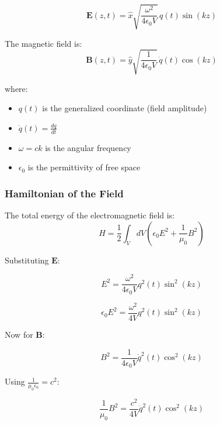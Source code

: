 \begin{equation}
\mathbf{E}(z,t) = \hat{x} \sqrt{\frac{\omega^2}{4 \epsilon_0 V}} \, q(t) \sin(kz)
\end{equation}

The magnetic field is:
\begin{equation}
\mathbf{B}(z,t) = \hat{y} \sqrt{\frac{1}{4 \epsilon_0 V}} \, \dot{q}(t) \cos(kz)
\end{equation}

where:
\begin{itemize}
\item $q(t)$ is the generalized coordinate (field amplitude)
\item $\dot{q}(t) = \frac{dq}{dt}$
\item $\omega = ck$ is the angular frequency
\item $\epsilon_0$ is the permittivity of free space
\end{itemize}

\subsubsection{Hamiltonian of the Field}


The total energy of the electromagnetic field is:
\begin{equation}
H = \frac{1}{2} \int_V dV \left( \epsilon_0 E^2 + \frac{1}{\mu_0} B^2 \right)
\label{eq:energy}
\end{equation}


Substituting $\mathbf{E}$:

\begin{equation*}
E^2 = \frac{\omega^2}{4 \epsilon_0 V} q^2(t) \sin^2(kz)
\end{equation*}

\begin{equation*}
\epsilon_0 E^2 = \frac{\omega^2}{4 V} q^2(t) \sin^2(kz)
\end{equation*}

Now for $\mathbf{B}$:

\begin{equation*}
B^2 = \frac{1}{4 \epsilon_0 V} \dot{q}^2(t) \cos^2(kz)
\end{equation*}

Using $\frac{1}{\mu_0 \epsilon_0} = c^2$:

\begin{equation*}
\frac{1}{\mu_0} B^2 = \frac{c^2}{4 V} \dot{q}^2(t) \cos^2(kz)
\end{equation*}

